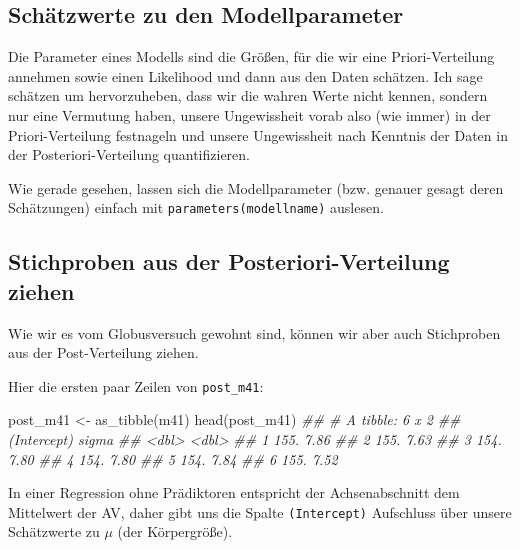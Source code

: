 \documentclass[
  a4paper,
  DIV=11]{scrreprt}
\newenvironment{Shaded}{\begin{snugshade}}{\end{snugshade}}
\newcommand{\DocumentationTok}[1]{\textcolor[rgb]{0.37,0.37,0.37}{\textit{#1}}}
\newcommand{\FunctionTok}[1]{\textcolor[rgb]{0.28,0.35,0.67}{#1}}
\newcommand{\NormalTok}[1]{\textcolor[rgb]{0.00,0.23,0.31}{#1}}
\newcommand{\OtherTok}[1]{\textcolor[rgb]{0.00,0.23,0.31}{#1}}
\theoremstyle{definition}
\theoremstyle{remark}
\begin{document}
\hypertarget{schuxe4tzwerte-zu-den-modellparameter}{%
\subsection{Schätzwerte zu den
Modellparameter}\label{schuxe4tzwerte-zu-den-modellparameter}}

Die Parameter eines Modells sind die Größen, für die wir eine
Priori-Verteilung annehmen sowie einen Likelihood und dann aus den Daten
schätzen. Ich sage schätzen um hervorzuheben, dass wir die wahren Werte
nicht kennen, sondern nur eine Vermutung haben, unsere Ungewissheit
vorab also (wie immer) in der Priori-Verteilung festnageln und unsere
Ungewissheit nach Kenntnis der Daten in der Posteriori-Verteilung
quantifizieren.

Wie gerade gesehen, lassen sich die Modellparameter (bzw. genauer gesagt
deren Schätzungen) einfach mit \texttt{parameters(modellname)} auslesen.

\hypertarget{stichproben-aus-der-posteriori-verteilung-ziehen}{%
\subsection{Stichproben aus der Posteriori-Verteilung
ziehen}\label{stichproben-aus-der-posteriori-verteilung-ziehen}}

Wie wir es vom Globusversuch gewohnt sind, können wir aber auch
Stichproben aus der Post-Verteilung ziehen.

Hier die ersten paar Zeilen von \texttt{post\_m41}:

\begin{Shaded}
\begin{Highlighting}[]
\NormalTok{post\_m41 }\OtherTok{\textless{}{-}} \FunctionTok{as\_tibble}\NormalTok{(m41)}
\FunctionTok{head}\NormalTok{(post\_m41)}
\DocumentationTok{\#\# \# A tibble: 6 x 2}
\DocumentationTok{\#\#   \textasciigrave{}(Intercept)\textasciigrave{} sigma}
\DocumentationTok{\#\#           \textless{}dbl\textgreater{} \textless{}dbl\textgreater{}}
\DocumentationTok{\#\# 1          155.  7.86}
\DocumentationTok{\#\# 2          155.  7.63}
\DocumentationTok{\#\# 3          154.  7.80}
\DocumentationTok{\#\# 4          154.  7.80}
\DocumentationTok{\#\# 5          154.  7.84}
\DocumentationTok{\#\# 6          155.  7.52}
\end{Highlighting}
\end{Shaded}

In einer Regression ohne Prädiktoren entspricht der Achsenabschnitt dem
Mittelwert der AV, daher gibt uns die Spalte \texttt{(Intercept)}
Aufschluss über unsere Schätzwerte zu \(\mu\) (der Körpergröße).
\end{document}
